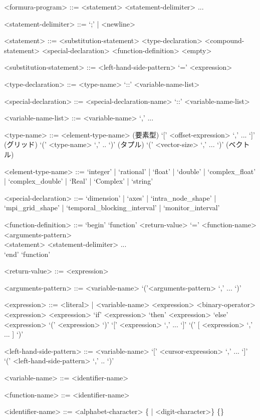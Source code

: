 \documentclass{jsarticle}
\begin{document}
\begin{grammar}
<formura-program> ::= <statement> <statement-delimiter> ...

<statement-delimiter> ::= `;' | <newline>

  <statement> ::= <substitution-statement> \alt
  <type-declaration> \alt
  <compound-statement> \alt
  <special-declaration> \alt
  <function-definition> \alt
 <empty>

 <substitution-statement> ::= <left-hand-side-pattern> `=' <expression>

 <type-declaration> ::= <type-name> `::' <variable-name-list>

 <special-declaration> ::= <special-declaration-name> `::' <variable-name-list>

 <variable-name-list> ::= <variable-name> `,' ...

<type-name> ::= <element-type-name>                  \hfill {(要素型)}
 `[' <offset-expression> `,' ... `]' \hfill {(グリッド)}
\alt `(' <type-name> `,' .. `)'                      \hfill {(タプル)}
 `(' <vector-size> `,' ... `)'                   \hfill {(ベクトル)}

<element-type-name> ::= `integer' | `rational' | `float' | `double'
| `complex_float' | `complex_double'
| `Real' | `Complex' | `string'

<special-declaration> ::= `dimension' | `axes' | `intra_node_shape' | `mpi_grid_shape' | `temporal_blocking_interval' | `monitor_interval'

<function-definition> ::=
  `begin' `function' <return-value> `=' <function-name> <arguments-pattern> \\
\hspace{2em}<statement> <statement-delimiter> ...  \\
    `end' `function'

<return-value> ::= <expression>

<arguments-pattern>     ::= <variable-name>
                         \alt  `('<arguments-pattern>  `,' ... `)'


<expression> ::= <literal> | <variable-name>
\alt <expression> <binary-operator> <expression>
 <expression>
\alt `if' <expression> `then' <expression> `else' <expression>
\alt  `('  <expression>  `)'
 `[' <expression> `,' ... `]'
 `(' [ <expression> `,' ... ] `)'


  <left-hand-side-pattern> ::= <variable-name>
   `[' <cursor-expression> `,' ... `]'
  \alt `(' <left-hand-side-pattern> `,' .. `)'

<variable-name> ::= <identifier-name>

<function-name> ::= <identifier-name>

<identifier-name> ::= <alphabet-character> \{<alphabet-character> | <digit-character>\}
   \{<symbol-character>\}

\end{grammar}
\end{document}
